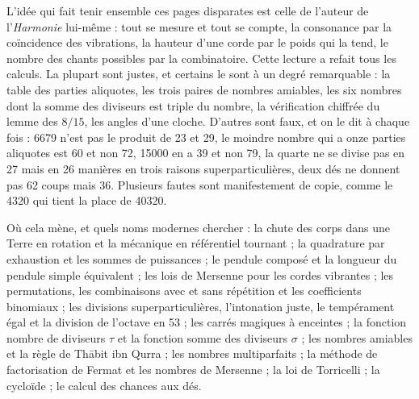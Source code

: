 \documentclass[11pt,a4paper]{article}
\begin{document}
\begin{resume}
L'idée qui fait tenir ensemble ces pages disparates est celle de l'auteur de
l'\emph{Harmonie} lui-même : tout se mesure et tout se compte, la consonance par
la coïncidence des vibrations, la hauteur d'une corde par le poids qui la
tend, le nombre des chants possibles par la combinatoire. Cette lecture a
refait tous les calculs. La plupart sont justes, et certains le sont à un
degré remarquable : la table des parties aliquotes, les trois paires de
nombres amiables, les six nombres dont la somme des diviseurs est triple du
nombre, la vérification chiffrée du lemme des $8/15$, les angles d'une cloche.
D'autres sont faux, et on le dit à chaque fois : 6679 n'est pas le produit de 23
et 29, le moindre nombre qui a onze parties aliquotes est 60 et non 72, 15000 en
a 39 et non 79, la quarte ne se divise pas en 27 mais en 26 manières en trois
raisons superparticulières, deux dés ne donnent pas 62 coups mais 36. Plusieurs
fautes sont manifestement de copie, comme le 4320 qui tient la place de 40320.

Où cela mène, et quels noms modernes chercher : la chute des corps dans une
Terre en rotation et la mécanique en référentiel tournant ; la quadrature par
exhaustion et les sommes de puissances ; le pendule composé et la longueur
du pendule simple équivalent ; les lois de Mersenne pour les cordes
vibrantes ; les permutations, les combinaisons avec et sans répétition et les
coefficients binomiaux ; les divisions superparticulières, l'intonation juste,
le tempérament égal et la division de l'octave en 53 ; les carrés magiques à
enceintes ; la fonction nombre de diviseurs $\tau$ et la fonction somme des
diviseurs $\sigma$ ; les nombres amiables et la règle de Thābit ibn Qurra ; les
nombres multiparfaits ; la méthode de factorisation de Fermat et les nombres de
Mersenne ; la loi de Torricelli ; la cycloïde ; le calcul des chances aux dés.

\end{resume}
\end{document}

